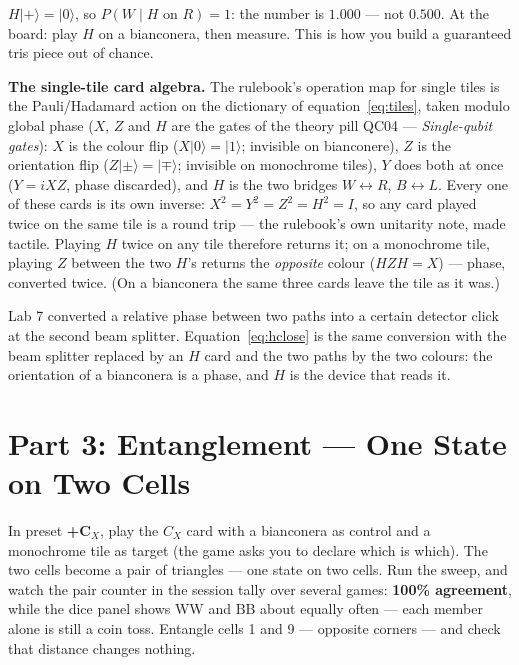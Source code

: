 \documentclass[a4paper,11pt]{article}
\providecommand{\ket}[1]{|#1\rangle}
\begin{document}
\begin{numberbox}
$H\ket{+} = \ket{0}$, so $P(W \mid H \text{ on } R) = 1$: the number is $1.000$ --- not
$0.500$. At the board: play $H$ on a bianconera, then measure. This is how you build a
guaranteed tris piece out of chance.
\end{numberbox}

\begin{deepdivebox}
\textbf{The single-tile card algebra.} The rulebook's operation map for single tiles is
the Pauli/Hadamard action on the dictionary of equation~\eqref{eq:tiles}, taken modulo
global phase ($X$, $Z$ and $H$ are the gates of the theory pill QC04 ---
\textit{Single-qubit gates}): $X$ is the colour flip ($X\ket{0} = \ket{1}$; invisible on bianconere),
$Z$ is the orientation flip ($Z\ket{\pm} = \ket{\mp}$; invisible on monochrome tiles),
$Y$ does both at once ($Y = iXZ$, phase discarded), and $H$ is the two bridges
$W \leftrightarrow R$, $B \leftrightarrow L$. Every one of these cards is its own
inverse: $X^2 = Y^2 = Z^2 = H^2 = I$, so any card played twice on the same tile is a
round trip --- the rulebook's own unitarity note, made tactile. Playing $H$ twice on any
tile therefore returns it; on a monochrome tile, playing $Z$ between the two $H$'s returns
the \emph{opposite} colour ($HZH = X$) --- phase, converted twice. (On a bianconera the same
three cards leave the tile as it was.)
\end{deepdivebox}

\begin{connectionbox}
Lab 7 converted a relative phase between two paths into a certain detector click at
the second beam splitter. Equation~\eqref{eq:hclose} is the same conversion with the
beam splitter replaced by an $H$ card and the two paths by the two colours: the
orientation of a bianconera is a phase, and $H$ is the device that reads it.
\end{connectionbox}

\section{Part 3: Entanglement --- One State on Two Cells}

\begin{playbox}
In preset \textbf{+C$_X$}, play the $C_X$ card with a bianconera as control and a
monochrome tile as target (the game asks you to declare which is which). The two cells
become a pair of triangles --- one state on two cells. Run the sweep, and watch the pair
counter in the session tally over several games: \textbf{100\% agreement}, while the dice
panel shows WW and BB about equally often --- each member alone is still a coin toss. Entangle cells 1 and 9 --- opposite corners ---
and check that distance changes nothing.
\end{playbox}
\end{document}
